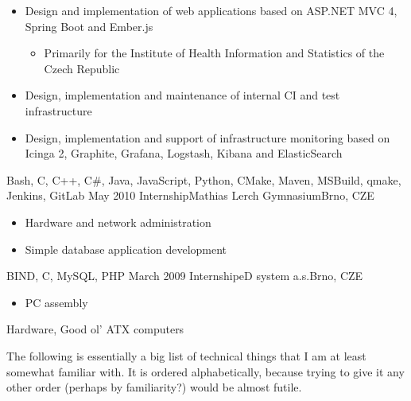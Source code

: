 \documentclass[localFont,alternative]{yaac-another-awesome-cv}
\newcommand{\dumblang}[2]{{#2}}
\begin{document}
\begin{experiences}
{\begin{itemize}
				\item \dumblang{Vývoj a návrh webových aplikací na bázi ASP.NET MVC 4, Spring Boot a Ember.js.}{Design and implementation of web applications based on ASP.NET MVC 4, Spring Boot and Ember.js}
					\begin{itemize}
						\item \dumblang{Primárně pro Ústav zdravotnických informací a statistiky ČR}{Primarily for the Institute of Health Information and Statistics of the Czech Republic}
					\end{itemize}
				\item \dumblang{Instalace, konfigurace a údržba interní CI a testovací infrastruktury}{Design, implementation and maintenance of internal CI and test infrastructure}
				\item \dumblang{Vývoj, instalace, konfigurace a podpora monitorovací infrastruktury na bázi Icinga 2, Graphite, Grafana, Logstash, Kibana, ElasticSearch}{Design, implementation and support of infrastructure monitoring based on Icinga 2, Graphite, Grafana, Logstash, Kibana and ElasticSearch}
				\end{itemize}
			}
			{Bash, C, C++, C\#, Java, JavaScript, Python, CMake, Maven, MSBuild, qmake, Jenkins, GitLab}
		\emptySeparator
		\experience
			{\dumblang{Květen 2010}{May 2010}}
			{\dumblang{Odborná praxe}{Internship}}{\dumblang{Gymnázium Matyáše Lercha}{Mathias Lerch Gymnasium}}{\dumblang{Brno}{Brno, CZE}}
			{}
			{
				\begin{itemize}
					\item \dumblang{Správa HW a sítě}{Hardware and network administration}
					\item \dumblang{Vývoj databázových aplikací}{Simple database application development}
				\end{itemize}
			}
			{BIND, C, MySQL, PHP}
		\emptySeparator
		\experience
			{\dumblang{Březen 2009}{March 2009}}
			{\dumblang{Odborná praxe}{Internship}}{eD system a.s.}{\dumblang{Brno}{Brno, CZE}}
			{}
			{
				\begin{itemize}
					\item \dumblang{Montáž PC}{PC assembly}
				\end{itemize}
			}
			{Hardware, \dumblang{ATX počítače}{Good ol' ATX computers}}
		\emptySeparator
	\end{experiences}

	\sectionTitle{\dumblang{Znalosti}{Skills}}{\faCode}

	The following is essentially a big list of technical things that I am at least somewhat familiar with. It is ordered alphabetically,
	because trying to give it any other order (perhaps by familiarity?) would be almost futile. 
\end{document}
